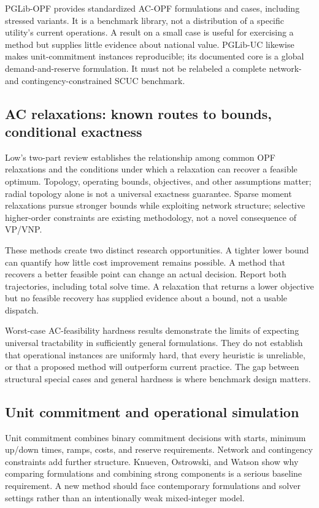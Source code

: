 \documentclass[11pt,letterpaper]{article}
\begin{document}
PGLib-OPF provides standardized AC-OPF formulations and cases, including stressed variants. It is a benchmark library, not a distribution of a specific utility's current operations. A result on a small case is useful for exercising a method but supplies little evidence about national value.\cite{pglib} PGLib-UC likewise makes unit-commitment instances reproducible; its documented core is a global demand-and-reserve formulation. It must not be relabeled a complete network- and contingency-constrained SCUC benchmark.\cite{pglibuc}

\subsection{AC relaxations: known routes to bounds, conditional exactness}
Low's two-part review establishes the relationship among common OPF relaxations and the conditions under which a relaxation can recover a feasible optimum. Topology, operating bounds, objectives, and other assumptions matter; radial topology alone is not a universal exactness guarantee.\cite{low1,low2} Sparse moment relaxations pursue stronger bounds while exploiting network structure; selective higher-order constraints are existing methodology, not a novel consequence of VP/VNP.\cite{moment}

These methods create two distinct research opportunities. A tighter lower bound can quantify how little cost improvement remains possible. A method that recovers a better feasible point can change an actual decision. Report both trajectories, including total solve time. A relaxation that returns a lower objective but no feasible recovery has supplied evidence about a bound, not a usable dispatch.

Worst-case AC-feasibility hardness results demonstrate the limits of expecting universal tractability in sufficiently general formulations.\cite{hardness} They do not establish that operational instances are uniformly hard, that every heuristic is unreliable, or that a proposed method will outperform current practice. The gap between structural special cases and general hardness is where benchmark design matters.

\subsection{Unit commitment and operational simulation}
Unit commitment combines binary commitment decisions with starts, minimum up/down times, ramps, costs, and reserve requirements. Network and contingency constraints add further structure. Knueven, Ostrowski, and Watson show why comparing formulations and combining strong components is a serious baseline requirement.\cite{uc} A new method should face contemporary formulations and solver settings rather than an intentionally weak mixed-integer model.
\end{document}

